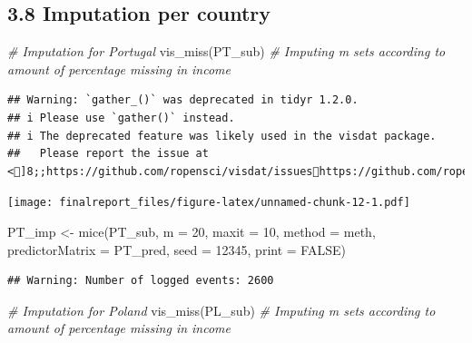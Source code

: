 \documentclass[
]{article}
\newenvironment{Shaded}{\begin{snugshade}}{\end{snugshade}}
\newcommand{\AttributeTok}[1]{\textcolor[rgb]{0.77,0.63,0.00}{#1}}
\newcommand{\CommentTok}[1]{\textcolor[rgb]{0.56,0.35,0.01}{\textit{#1}}}
\newcommand{\ConstantTok}[1]{\textcolor[rgb]{0.00,0.00,0.00}{#1}}
\newcommand{\DecValTok}[1]{\textcolor[rgb]{0.00,0.00,0.81}{#1}}
\newcommand{\FunctionTok}[1]{\textcolor[rgb]{0.00,0.00,0.00}{#1}}
\newcommand{\NormalTok}[1]{#1}
\newcommand{\OtherTok}[1]{\textcolor[rgb]{0.56,0.35,0.01}{#1}}
\begin{document}
\hypertarget{imputation-per-country}{%
\subsection{3.8 Imputation per country}\label{imputation-per-country}}

\begin{Shaded}
\begin{Highlighting}[]
\CommentTok{\# Imputation for Portugal}
\FunctionTok{vis\_miss}\NormalTok{(PT\_sub) }\CommentTok{\# Imputing m sets according to amount of percentage missing in income}
\end{Highlighting}
\end{Shaded}

\begin{verbatim}
## Warning: `gather_()` was deprecated in tidyr 1.2.0.
## i Please use `gather()` instead.
## i The deprecated feature was likely used in the visdat package.
##   Please report the issue at <]8;;https://github.com/ropensci/visdat/issueshttps://github.com/ropensci/visdat/issues]8;;>.
\end{verbatim}

\texttt{[image: finalreport\_files/figure-latex/unnamed-chunk-12-1.pdf]}

\begin{Shaded}
\begin{Highlighting}[]
\NormalTok{PT\_imp }\OtherTok{\textless{}{-}} \FunctionTok{mice}\NormalTok{(PT\_sub,}
               \AttributeTok{m =} \DecValTok{20}\NormalTok{,}
               \AttributeTok{maxit =} \DecValTok{10}\NormalTok{, }
               \AttributeTok{method =}\NormalTok{ meth,}
               \AttributeTok{predictorMatrix =}\NormalTok{ PT\_pred,}
               \AttributeTok{seed =} \DecValTok{12345}\NormalTok{,}
               \AttributeTok{print =} \ConstantTok{FALSE}\NormalTok{)}
\end{Highlighting}
\end{Shaded}

\begin{verbatim}
## Warning: Number of logged events: 2600
\end{verbatim}

\begin{Shaded}
\begin{Highlighting}[]
\CommentTok{\# Imputation for Poland}
\FunctionTok{vis\_miss}\NormalTok{(PL\_sub) }\CommentTok{\# Imputing m sets according to amount of percentage missing in income}
\end{Highlighting}
\end{Shaded}
\end{document}
